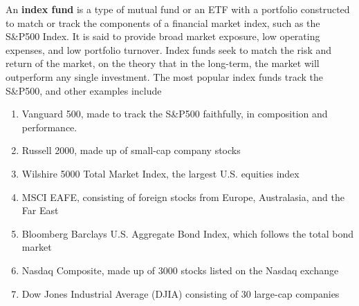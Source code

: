 \documentclass{article}
\begin{document}
      \begin{definition}
        An \textbf{index fund} is a type of mutual fund or an ETF with a portfolio constructed to match or track the components of a financial market index, such as the S\&P500 Index. It is said to provide broad market exposure, low operating expenses, and low portfolio turnover. Index funds seek to match the risk and return of the market, on the theory that in the long-term, the market will outperform any single investment. The most popular index funds track the S\&P500, and other examples include
        \begin{enumerate}
          \item Vanguard 500, made to track the S\&P500 faithfully, in composition and performance. 
          \item Russell 2000, made up of small-cap company stocks
          \item Wilshire 5000 Total Market Index, the largest U.S. equities index 
          \item MSCI EAFE, consisting of foreign stocks from Europe, Australasia, and the Far East
          \item Bloomberg Barclays U.S. Aggregate Bond Index, which follows the total bond market
          \item Nasdaq Composite, made up of 3000 stocks listed on the Nasdaq exchange
          \item Dow Jones Industrial Average (DJIA) consisting of 30 large-cap companies
        \end{enumerate}
      \end{definition}
\end{document}
